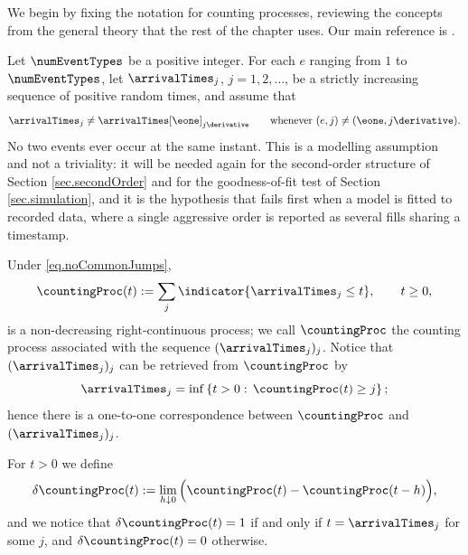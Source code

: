 We begin by fixing the notation for counting processes,
reviewing the concepts from the general theory that the rest of the chapter uses.
Our main reference is \cite[Chapter 14]{DVJ08int}.

Let $\numEventTypes$ be a positive integer.
For each $e$ ranging from $1$ to $\numEventTypes$,
let $\arrivalTimes_{j}$, $j = 1, 2, \dots$, be a strictly increasing sequence of positive random times,
and assume that
\begin{equation}\label{eq.noCommonJumps}
 \arrivalTimes_{j} \neq \arrivalTimes[\eone]_{j\derivative}
 \qquad \text{whenever } (e,j) \neq (\eone, j\derivative).
\end{equation}
No two events ever occur at the same instant.
This is a modelling assumption and not a triviality:
it will be needed again for the second-order structure of Section \ref{sec.secondOrder}
and for the goodness-of-fit test of Section \ref{sec.simulation},
and it is the hypothesis that fails first when a model is fitted to recorded data,
where a single aggressive order is reported as several fills sharing a timestamp.

Under \eqref{eq.noCommonJumps},
\begin{equation*}
 \countingProc(t) := \sum_{j} \indicator{\arrivalTimes_{j} \leq t},
 \qquad t \geq 0,
\end{equation*}
is a non-decreasing right-continuous process;
we call $\countingProc$ the counting process associated with the sequence $(\arrivalTimes_{j})_j$.
Notice that $(\arrivalTimes_{j})_j$ can be retrieved from $\countingProc$ by
\begin{equation*}
 \arrivalTimes_{j} = \inf \left\lbrace t>0: \, \countingProc(t) \geq j \right\rbrace;
\end{equation*}
hence there is a one-to-one correspondence between $\countingProc$ and $(\arrivalTimes_{j})_j$.

For $t>0$ we define
\begin{equation*}
 \delta\countingProc(t) := \lim_{h\downarrow 0} \Big( \countingProc(t) - \countingProc(t-h) \Big),
\end{equation*}
and we notice that $\delta \countingProc(t) = 1$ if and only if $t = \arrivalTimes_{j}$ for some $j$,
and $\delta \countingProc(t) = 0$ otherwise.

